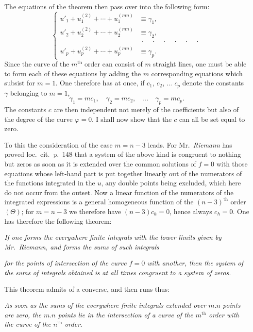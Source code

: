 \documentclass{article}
\begin{document}
The equations of the theorem then pass over into the following form:
\[
\left\{
\begin{aligned}
u'_{1} + u_{1}^{(2)} + \cdots + u_{1}^{(mn)} &\equiv \gamma_{1}, \\
u'_{2} + u_{2}^{(2)} + \cdots + u_{2}^{(mn)} &\equiv \gamma_{2}, \\
&\ \cdot\quad\cdot\quad\cdot\quad\cdot\quad\cdot\quad\cdot \\
u'_{p} + u_{p}^{(2)} + \cdots + u_{p}^{(mn)} &\equiv \gamma_{p}.
\end{aligned}
\right.
\tag{6.}
\]
Since the curve of the $m^{\text{th}}$ order can consist of $m$ straight lines, one must be able to form each of these equations by adding the $m$ corresponding equations which subsist for $m = 1$. One therefore has at once, if $c_{1}$, $c_{2}$, $\ldots$ $c_{p}$ denote the constants $\gamma$ belonging to $m = 1$,
\[ \gamma_{1} = mc_{1}, \quad \gamma_{2} = mc_{2}, \quad \ldots \quad \gamma_{p} = mc_{p}. \]
The constants $c$ are then independent not merely of the coefficients but also of the degree of the curve $\varphi = 0$. I shall now show that the $c$ can all be set equal to zero.

To this the consideration of the case $m = n-3$ leads. For Mr.\ \emph{Riemann} has proved loc.\ cit.\ p.\ 148 that a system of the above kind is congruent to nothing but zeros as soon as it is extended over the common solutions of $f = 0$ with those equations whose left-hand part is put together linearly out of the numerators of the functions integrated in the $u$, any double points being excluded, which here do not occur from the outset. Now a linear function of the numerators of the integrated expressions is a general homogeneous function of the $(n-3)^{\text{th}}$ order $(\Theta)$; for $m = n-3$ we therefore have $(n-3)c_{h} = 0$, hence always $c_{h} = 0$. One has therefore the following theorem:

\emph{If one forms the everywhere finite integrals with the lower limits given by Mr.\ Riemann, and forms the sums of such integrals}

\emph{ for the points of intersection of the curve $f = 0$ with another, then the system of the sums of integrals obtained is at all times congruent to a system of zeros.}

This theorem admits of a converse, and then runs thus:

\emph{As soon as the sums of the everywhere finite integrals extended over $m.n$ points are zero, the $m.n$ points lie in the intersection of a curve of the $m^{\text{th}}$ order with the curve of the $n^{\text{th}}$ order.}
\end{document}
